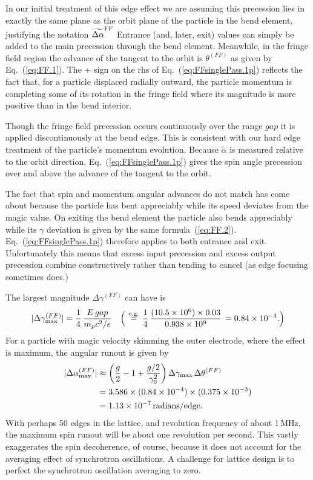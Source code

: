 \documentclass[]{article}
\begin{document}
In our initial treatment of this edge effect we are assuming
this precession lies in exactly the same plane as the
orbit plane of the particle in the bend element, justifying
the notation $\widetilde{\Delta\alpha}^{\rm FF}$
Entrance (and, later, exit) values can simply be added to the
main precession through the bend element.
Meanwhile, in the fringe field region the advance of the tangent 
to the orbit is $\theta^{(FF)}$ as given by Eq.~(\ref{eq:FF.1}).
The + sign on the rhs of Eq.~(\ref{eq:FFsinglePass.1p}) 
reflects the fact that,
for a particle displaced radially outward, the particle momentum
is completing some of its rotation in the fringe field where 
its magnitude is more positive than in the bend interior.

Though the fringe field precession occurs continuously
over the range $gap$ it is applied discontinuously at
the bend edge. This is consistent with our hard edge treatment
of the particle's momentum evolution.
Because $\widetilde{\alpha}$ is measured relative to the orbit direction,
Eq.~(\ref{eq:FFsinglePass.1p}) gives the spin angle precession
over and above the advance of the tangent to the orbit.

The fact that spin and momentum angular advances do not 
match has come about because the particle has bent appreciably 
while its speed deviates from the magic value. On exiting the 
bend element the particle also bends appreciably while its 
$\gamma$ deviation is given by the same formula~(\ref{eq:FF.2}).
Eq.~(\ref{eq:FFsinglePass.1p}) therefore applies to both entrance 
and exit. Unfortunately this means that excess input precession and 
excess output
precession combine constructively rather than tending to cancel
(as edge focusing sometimes does.)

The largest magnitude $\Delta\gamma^{(FF)}$ can have is
%
\begin{equation}
|\Delta\gamma^{(FF)}_{\rm max}|
 =
\frac{1}{4}\,
\frac{E\,gap}{m_pc^2/e}
\quad
\Big(
\overset{\rm e.g.}{\ =\ }
\frac{1}{4}\,
\frac{(10.5\times10^6)\times0.03}{0.938\times10^9}\,
 =
0.84\times10^{-4}.
\Big)
\label{eq:FF.3m}
\end{equation}
%
For a particle with magic velocity skimming the outer electrode,
where the effect is maximum,
the angular runout is given by 
%
\begin{align}
|\Delta\alpha^{(FF)}_{\rm max}|
 &\approx
\bigg(\frac{g}{2} - 1 + \frac{g/2}{\gamma_0^2}\bigg)\,
\Delta\gamma_{\rm max}\,
\Delta\theta^{(FF)}         \notag\\
 &=
3.586
\times 
(0.84\times10^{-4})
\times
(0.375\times10^{-3})      \notag\\
 &=                      
1.13\times10^{-7}\,{\rm radians/edge}.
\label{eq:FFsinglePass.2}
\end{align}
%
With perhaps 50 edges in the lattice, and revolution frequency of 
about 1\,MHz, the maximum spin runout will be about one
revolution per second. This vastly exaggerates the spin
decoherence, of course, because it does not account for
the averaging effect of synchrotron oscillations.
A challenge for lattice design is
to perfect the synchrotron oscillation averaging to zero. 
\end{document}
